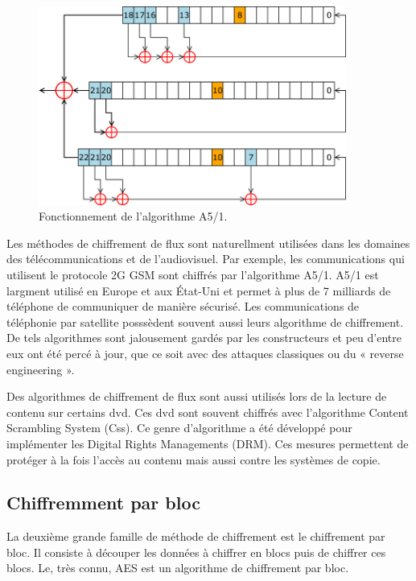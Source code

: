 			\begin{figure}[!h]
				\centering
				\includegraphics[width=0.9\textwidth]{imgs/application/A5.png}
				\caption{Fonctionnement de l'algorithme A5/1.}
				\label{algoA5}
			\end{figure}
			
			Les méthodes de chiffrement de flux sont naturellment utilisées dans les domaines des télécommunications et de l'audiovisuel.
			Par exemple, les communications qui utilisent le protocole 2G GSM sont chiffrés par l'algorithme A5/1.
			A5/1 est largment utilisé en Europe et aux État-Uni et permet à plus de 7 milliards de téléphone de communiquer de manière sécurisé\cite{7milliards}.
			Les communications de téléphonie par satellite posssèdent souvent aussi leurs algorithme de chiffrement.
			De tels algorithmes sont jalousement gardés par les constructeurs et peu d'entre eux ont été percé à jour, que ce soit avec des attaques classiques ou du « reverse engineering ».
			
			Des algorithmes de chiffrement de flux sont aussi utilisés lors de la lecture de contenu sur certains dvd. Ces dvd sont souvent chiffrés avec l'algorithme Content Scrambling System (Css).
			Ce genre d'algorithme a été développé pour implémenter les Digital Rights Managements (DRM). Ces mesures permettent de protéger à la fois l'accès au contenu mais aussi contre les systèmes de copie.
			
			\subsection{Chiffremment par bloc}
			
			La deuxième grande famille de méthode de chiffrement est le chiffrement par bloc. Il consiste à découper les données à chiffrer en blocs puis de chiffrer ces blocs.
			Le, très connu, AES est un algorithme de chiffrement par bloc.
			
